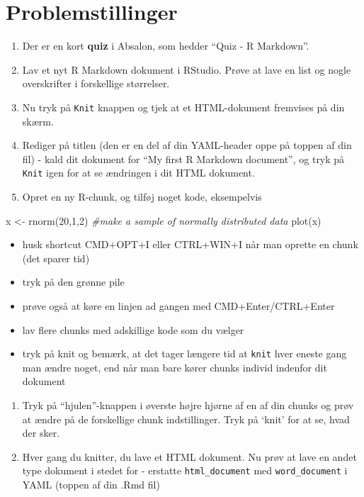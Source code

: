 \documentclass[
]{book}
\newenvironment{Shaded}{\begin{snugshade}}{\end{snugshade}}
\newcommand{\CommentTok}[1]{\textcolor[rgb]{0.56,0.35,0.01}{\textit{#1}}}
\newcommand{\DecValTok}[1]{\textcolor[rgb]{0.00,0.00,0.81}{#1}}
\newcommand{\FunctionTok}[1]{\textcolor[rgb]{0.00,0.00,0.00}{#1}}
\newcommand{\NormalTok}[1]{#1}
\newcommand{\OtherTok}[1]{\textcolor[rgb]{0.56,0.35,0.01}{#1}}
\providecommand{\tightlist}{%
  \setlength{\itemsep}{0pt}\setlength{\parskip}{0pt}}
\begin{document}
\hypertarget{problemstillinger-1}{%
\section{Problemstillinger}\label{problemstillinger-1}}

\begin{enumerate}
\def\labelenumi{\arabic{enumi})}
\item
  Der er en kort \textbf{quiz} i Absalon, som hedder ``Quiz - R Markdown''.
\item
  Lav et nyt R Markdown dokument i RStudio. Prøve at lave en list og nogle overskrifter i forskellige størrelser.
\item
  Nu tryk på \texttt{Knit} knappen og tjek at et HTML-dokument fremvises på din skærm.
\item
  Rediger på titlen (den er en del af din YAML-header oppe på toppen af din fil) - kald dit dokument for ``My first R Markdown document'', og tryk på \texttt{Knit} igen for at se ændringen i dit HTML dokument.
\item
  Opret en ny R-chunk, og tilføj noget kode, eksempelvis
\end{enumerate}

\begin{Shaded}
\begin{Highlighting}[]
\NormalTok{x }\OtherTok{\textless{}{-}} \FunctionTok{rnorm}\NormalTok{(}\DecValTok{20}\NormalTok{,}\DecValTok{1}\NormalTok{,}\DecValTok{2}\NormalTok{) }\CommentTok{\#make a sample of normally distributed data}
\FunctionTok{plot}\NormalTok{(x)}
\end{Highlighting}
\end{Shaded}

\begin{itemize}
\tightlist
\item
  husk shortcut CMD+OPT+I eller CTRL+WIN+I når man oprette en chunk (det sparer tid)
\item
  tryk på den grønne pile
\item
  prøve også at køre en linjen ad gangen med CMD+Enter/CTRL+Enter
\item
  lav flere chunks med adskillige kode som du vælger
\item
  tryk på knit og bemærk, at det tager længere tid at \texttt{knit} hver eneste gang man ændre noget, end når man bare kører chunks individ indenfor dit dokument
\end{itemize}

\begin{enumerate}
\def\labelenumi{\arabic{enumi})}
\setcounter{enumi}{5}
\item
  Tryk på ``hjulen''-knappen i øverste højre hjørne af en af din chunks og prøv at ændre på de forskellige chunk indstillinger. Tryk på `knit' for at se, hvad der sker.
\item
  Hver gang du knitter, du lave et HTML dokument. Nu prøv at lave en andet type dokument i stedet for - erstatte \texttt{html\_document} med \texttt{word\_document} i YAML (toppen af din .Rmd fil)
\end{enumerate}
\end{document}
